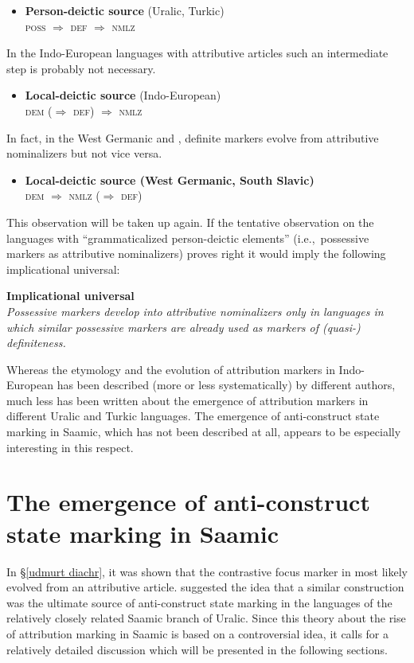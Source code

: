 {\begin{itemize}
\item \textbf{Person-deictic source} (Uralic, Turkic)\\
	\textsc{poss $\Rightarrow$ def $\Rightarrow$ nmlz}
\end{itemize}
In the Indo-European languages with attributive articles such an intermediate step is probably not necessary.
\begin{itemize}
\item \textbf{Local-deictic source} (Indo-European)\\
	\textsc{dem ($\Rightarrow$ def) $\Rightarrow$ nmlz}
\end{itemize}
In fact, in the West Germanic and , definite markers evolve from attributive nominalizers but not vice versa.
\begin{itemize}
\item \textbf{Local-deictic source (West Germanic, South Slavic)}\\
	\textsc{dem $\Rightarrow$ nmlz ($\Rightarrow$ def)}
\end{itemize}
This observation will be taken up again. If the tentative observation on the languages with “grammaticalized person-deictic elements” (i.e.,~possessive markers as attributive nominalizers) proves right it would imply the following implicational universal:
\begin{exe}
\label{universal}
\ex \rm{\textbf{Implicational universal}}\\
	\textit{Possessive markers develop into attributive nominalizers only in languages in which similar possessive markers are already used as markers of (quasi-) definiteness.}
\end{exe}
Whereas the etymology and the evolution of attribution markers in Indo\hyp{}European has been described (more or less systematically) by different authors, much less has been written about the emergence of attribution markers in different Uralic and Turkic languages. The emergence of anti\hyp{}construct state marking in Saamic, which has not been described at all, appears to be especially interesting in this respect.

\section[Anti\hyp{}construct state in Saamic]{The emergence of anti\hyp{}construct state marking in Saamic} \label{saamic diachr}
In \S\ref{udmurt diachr}, it was shown that the contrastive focus marker in  most likely evolved from an attributive article. \cite{riesler2006b} suggested the idea that a similar construction was the ultimate source of anti\hyp{}construct state marking in the languages of the relatively closely related Saamic branch of Uralic. Since this theory about the rise of attribution marking in Saamic is based on a controversial idea, it calls for a relatively detailed discussion which will be presented in the following sections.

}
